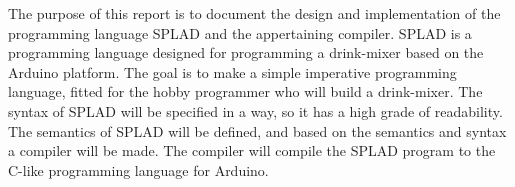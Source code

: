 The purpose of this report is to document the design and implementation of the programming language SPLAD and the appertaining compiler. SPLAD is a programming language designed for programming a drink-mixer based on the Arduino platform. The goal is to make a simple imperative programming language, fitted for the hobby programmer who will build a drink-mixer. The syntax of SPLAD will be specified in a way, so it has a high grade of readability. The semantics of SPLAD will be defined, and based on the semantics and syntax a compiler will be made. The compiler will compile the SPLAD program to the C-like programming language for Arduino.